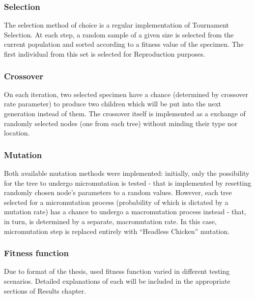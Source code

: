 \subsubsection{Selection}
The selection method of choice is a regular implementation of Tournament Selection. At each step, a random sample of a given size is selected from the current population and sorted according to a fitness value of the specimen. The first individual from this set is selected for Reproduction purposes.
\subsubsection{Crossover}
On each iteration, two selected specimen have a chance (determined by crossover rate parameter) to produce two children which will be put into the next generation instead of them. The crossover itself is implemented as a exchange of randomly selected nodes (one from each tree) without minding their type nor location.
\subsubsection{Mutation}
Both available mutation methods were implemented: initially, only the possibility for the tree to undergo micromutation is tested - that is implemented by resetting randomly chosen node's parameters to a random values. However, each tree selected for a micromutation process (probability of which is dictated by a mutation rate) has a chance to undergo a macromutation process instead - that, in turn, is determined by a separate, macromutation rate. In this case, micromutation step is replaced entirely with ``Headless Chicken'' mutation.
\subsubsection{Fitness function}
Due to format of the thesis, used fitness function varied in different testing scenarios. Detailed explanations of each will be included in the appropriate sections of Results chapter.
